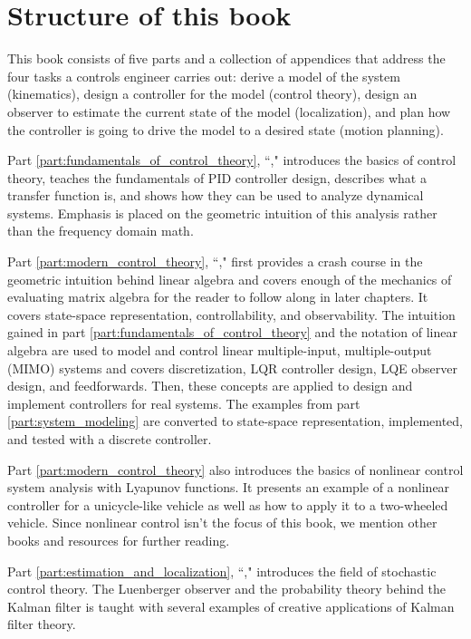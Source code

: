\section{Structure of this book}

This book consists of five parts and a collection of appendices that address the
four tasks a controls engineer carries out: derive a model of the system
(kinematics), design a controller for the model (control theory), design an
observer to estimate the current state of the model (localization), and plan how
the controller is going to drive the model to a desired state (motion planning).

Part \ref{part:fundamentals_of_control_theory},
``," introduces the basics of
control theory, teaches the fundamentals of PID controller design, describes
what a transfer function is, and shows how they can be used to analyze dynamical
systems. Emphasis is placed on the geometric intuition of this analysis rather
than the frequency domain math.

Part \ref{part:modern_control_theory}, ``,"
first provides a crash course in the geometric intuition behind linear algebra
and covers enough of the mechanics of evaluating matrix algebra for the reader
to follow along in later chapters. It covers state-space representation,
controllability, and observability. The intuition gained in part
\ref{part:fundamentals_of_control_theory} and the notation of linear algebra are
used to model and control linear multiple-input, multiple-output (MIMO) systems
and covers discretization, LQR controller design, LQE observer design, and
feedforwards. Then, these concepts are applied to design and implement
controllers for real systems. The examples from part \ref{part:system_modeling}
are converted to state-space representation, implemented, and tested with a
discrete controller.

Part \ref{part:modern_control_theory} also introduces the basics of nonlinear
control system analysis with Lyapunov functions. It presents an example of a
nonlinear controller for a unicycle-like vehicle as well as how to apply it to a
two-wheeled vehicle. Since nonlinear control isn't the focus of this book, we
mention other books and resources for further reading.

Part \ref{part:estimation_and_localization},
``," introduces the field of
stochastic control theory. The Luenberger observer and the probability theory
behind the Kalman filter is taught with several examples of creative
applications of Kalman filter theory.


